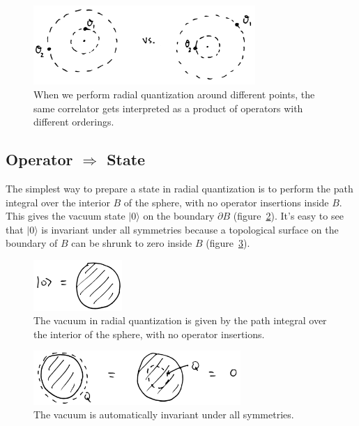 \documentclass{ws-rv9x6}
\newcommand\ptl\partial
\newcommand\<\langle
\renewcommand\>\rangle
\renewcommand\.{\cdot}
\begin{document}
\begin{figure}
\begin{center}
\includegraphics[width=0.75\textwidth]{radialquantdifferentpoints.jpg}
\end{center}
\caption{When we perform radial quantization around different points, the same correlator gets interpreted as a product of operators with different orderings.  \label{fig:radialquantdifferentpoints}}
\end{figure}

\subsection{Operator $\Longrightarrow$ State}
\label{sec:operatorimpliesstate}

The simplest way to prepare a state in radial quantization is to perform the path integral over the interior $B$ of the sphere, with no operator insertions inside $B$.  This gives the vacuum state $|0\>$ on the boundary $\ptl B$ (figure~\ref{fig:radialvacuum.jpg}).  It's easy to see that $|0\>$ is invariant under all symmetries because a topological surface on the boundary of $B$ can be shrunk to zero inside $B$ (figure~\ref{fig:vacuuminvariant}).

\begin{figure}
\begin{center}
\includegraphics[width=0.3\textwidth]{radialvacuum.jpg}
\end{center}
\caption{The vacuum in radial quantization is given by the path integral over the interior of the sphere, with no operator insertions.  \label{fig:radialvacuum.jpg}}
\end{figure}

\begin{figure}
\begin{center}
\includegraphics[width=0.7\textwidth]{vacuuminvariant.jpg}
\end{center}
\caption{The vacuum is automatically invariant under all symmetries.  \label{fig:vacuuminvariant}}
\end{figure}
\end{document}
